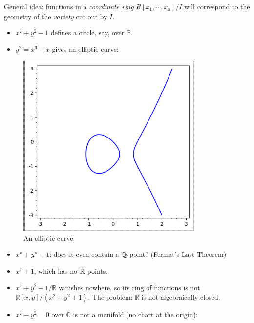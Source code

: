 General idea: functions in a \emph{coordinate ring}
\(R[x_1, \cdots, x_n]/I\) will correspond to the geometry of the
\emph{variety} cut out by \(I\).

\begin{example}

\envlist

\begin{itemize}
\item
  \(x^2 + y^2 - 1\) defines a circle, say, over \({\mathbb{R}}\)
\item
  \(y^2 = x^3-x\) gives an elliptic curve:
\end{itemize}

\begin{figure}
\centering
\includegraphics[width=3.64583in,height=\textheight]{figures/image_2020-08-21-01-04-22.png}
\caption{An elliptic curve.}
\end{figure}

\begin{itemize}
\item
  \(x^n+y^n-1\): does it even contain a \({\mathbb{Q}}{\hbox{-}}\)point?
  (Fermat's Last Theorem)
\item
  \(x^2 + 1\), which has no \({\mathbb{R}}{\hbox{-}}\)points.
\item
  \(x^2 + y^2 + 1/{\mathbb{R}}\) vanishes nowhere, so its ring of
  functions is not
  \({\mathbb{R}}[x, y] / \left\langle{x^2 + y^2 + 1}\right\rangle\). The
  problem: \({\mathbb{R}}\) is not algebraically closed.
\item
  \(x^2 - y^2 = 0\) over \({\mathbb{C}}\) is not a manifold (no chart at
  the origin):
\end{itemize}


\end{example}
